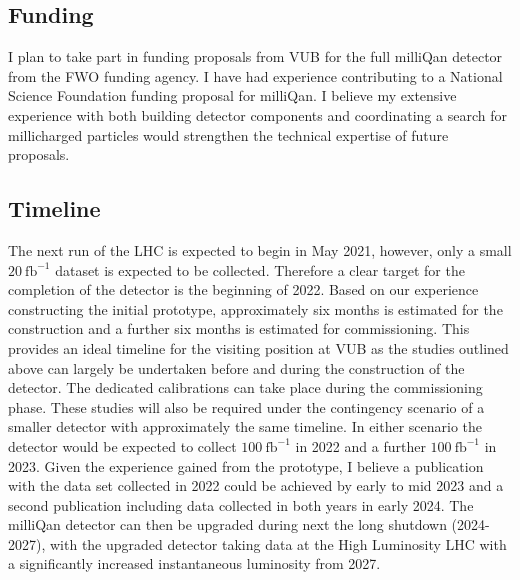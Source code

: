 \documentclass[11pt]{article}
\theoremstyle{plain} \numberwithin{equation}{section}
\theoremstyle{definition}
\begin{document}
\subsection*{Funding}

I plan to take part in funding proposals from VUB for the full milliQan detector
from the FWO funding agency. I have had experience contributing to a National Science
Foundation funding proposal for milliQan. I believe my extensive 
experience with both building detector components and coordinating 
a search for millicharged particles would strengthen the technical
expertise of future proposals.

\subsection*{Timeline}

The next run of the LHC is expected to begin in May 2021, however, only a small $20~\text{fb}^{-1}$ dataset is 
expected to be collected. Therefore a clear target for the completion of the detector
is the beginning of 2022. Based on our experience constructing the initial prototype, 
approximately six months is estimated for the construction and a further six months is
estimated for commissioning. This provides an ideal timeline for the visiting position at VUB as 
the studies outlined above can largely be undertaken before and during the construction of the detector.
The dedicated calibrations can take place during the commissioning phase. These studies will also be
required under the contingency scenario of a smaller detector with approximately the same timeline.
In either scenario the detector would be expected to collect $100~\text{fb}^{-1}$ in 2022 and a further $100~\text{fb}^{-1}$ in 2023.
Given the experience gained from the prototype, I believe a publication with the data set collected 
in 2022 could be achieved by early to mid 2023 and a second publication including data collected in both years in
early 2024. The milliQan detector can then be upgraded during next the long shutdown (2024-2027), with the upgraded
detector taking data at the High Luminosity LHC with a significantly increased instantaneous luminosity from 2027. 
\end{document}
